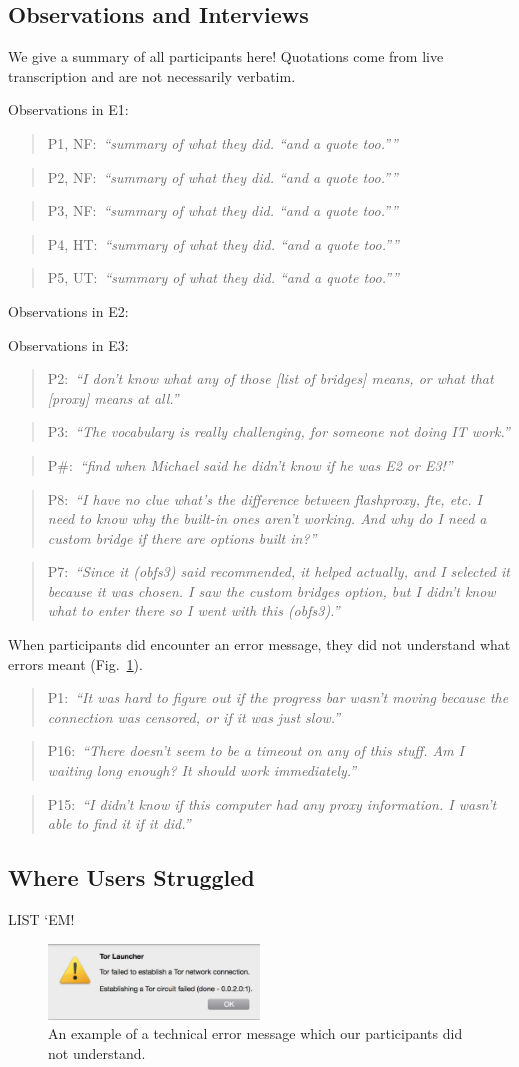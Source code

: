 \documentclass[USenglish,oneside,twocolumn]{article}
\newcommand{\pquote}[2]{
\begin{quotation}
\noindent #1:~\textit{``#2''}
\end{quotation}
}
\begin{document}
\subsection{Observations and Interviews} 
{\color {blue}
We give a summary of all participants here!  Quotations come from live transcription and are not necessarily verbatim.

Observations in E1: 
\pquote{P1, NF}{summary of what they did. ``and a quote too.''}
\pquote{P2, NF}{summary of what they did. ``and a quote too.''}
\pquote{P3, NF}{summary of what they did. ``and a quote too.''}
\pquote{P4, HT}{summary of what they did. ``and a quote too.''}
\pquote{P5, UT}{summary of what they did. ``and a quote too.''}

Observations in E2:

Observations in E3: 

\pquote{P2}{I don't know what any of those [list of bridges] means, or what that [proxy] means at all.}
\pquote{P3}{The vocabulary is really challenging, for someone not doing IT work.}
\pquote{P\#}{find when Michael said he didn't know if he was E2 or E3!} 
\pquote{P8}{I have no clue what's the difference between flashproxy, fte, etc. I need to know why the built-in ones aren't working. And why do I need a custom bridge if there are options built in?}
\pquote{P7}{Since it (obfs3) said recommended, it helped actually, and I selected it because it was chosen. I saw the custom bridges option, but I didn't know what to enter there so I went with this (obfs3).}
When participants did encounter an error message, they did not understand what errors meant (Fig.~\ref{fig:error}).
\pquote{P1}{It was hard to figure out if the progress bar wasn't moving because the connection was censored, or if it was just slow.}
\pquote{P16}{There doesn't seem to be a timeout on any of this stuff. Am I waiting long enough? It should work immediately.}
\pquote{P15}{I didn't know if this computer had any proxy information. I wasn't able to find it if it did.}

\subsection{Where Users Struggled} 
{\color {blue}
LIST `EM! 
}

\begin{figure}[t]
  \centering
    \includegraphics[width=0.5\textwidth]{error.png}
    \caption{An example of a technical error message which our participants did not understand.}
\label{fig:error}
\end{figure}
}
\end{document}
